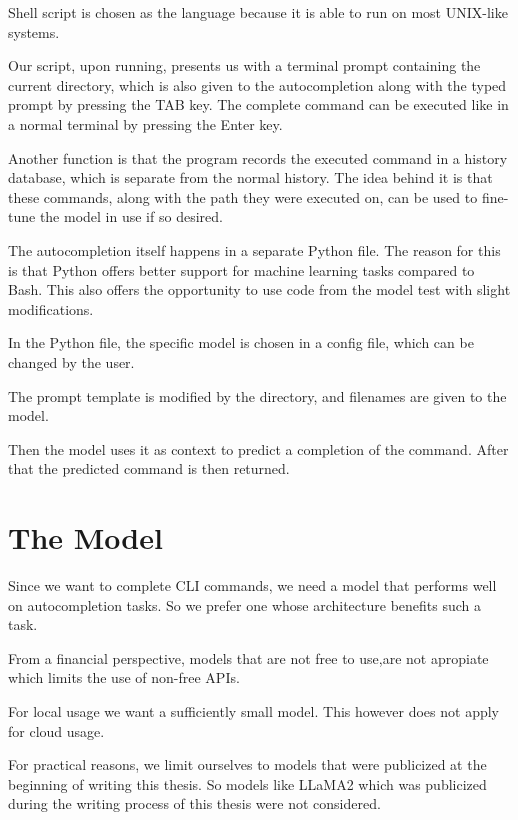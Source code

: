 


Shell script is chosen as the language because it is able to run on most UNIX-like systems.



Our script, upon running, presents us with a terminal prompt containing the current directory, which is also given to the autocompletion along with the typed prompt by pressing the TAB key. The complete command can be executed like in a normal terminal by pressing the Enter key. 


Another function is that the program records the executed command in a history database, which is separate from the normal history. The idea behind it is that these commands, along with the path they were executed on, can be used to fine-tune the model in use if so desired.



The autocompletion itself happens in a separate Python file. The reason for this is that Python offers better support for machine learning tasks compared to Bash. This also offers the opportunity to use code from the model test with slight modifications.


In the Python file, the specific model is chosen in a config file, which can be changed by the user.

The prompt template is modified by the directory, and filenames are given to the model.

Then the model uses it as context to predict  a completion of the command.
After that the predicted command is then returned.





\section{The Model}\raggedbottom


Since we want to complete CLI commands, we need a model that performs well on autocompletion tasks. So we prefer one whose architecture benefits such a task. 

From a financial perspective, models that are not free to use,are not apropiate which limits the use of non-free APIs. 

For local usage we want a sufficiently small model. This however does not apply for cloud usage. 

For practical reasons, we limit ourselves to models that were publicized at the beginning of writing this thesis. So models like LLaMA2 which was publicized during the writing process of this thesis were not considered.




